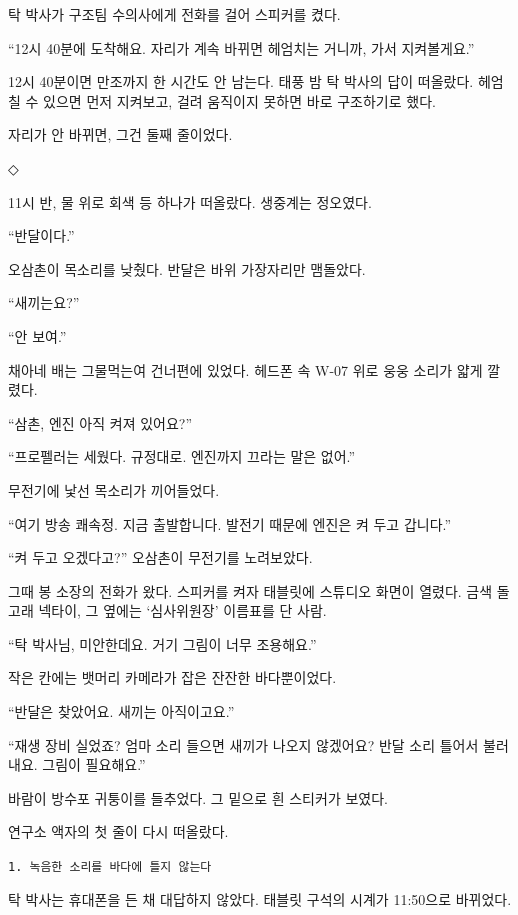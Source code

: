 \documentclass[
  korean,
  letterpaper,
  twoside,
  open=any,
  fontsize=12.5pt,
  headings=small]{scrbook}
\newcommand{\dateline}[1]{\par\noindent{\sffamily\small\color{gray}#1}\par\medskip}
\begin{document}
탁 박사가 구조팀 수의사에게
전화를 걸어 스피커를 켰다.

``12시 40분에 도착해요. 자리가
계속 바뀌면 헤엄치는 거니까,
가서 지켜볼게요.''

12시 40분이면 만조까지 한
시간도 안 남는다. 태풍 밤 탁
박사의 답이 떠올랐다. 헤엄칠
수 있으면 먼저 지켜보고, 걸려
움직이지 못하면 바로
구조하기로 했다.

자리가 안 바뀌면, 그건 둘째
줄이었다.

\begin{center}◇\end{center}\nopagebreak

11시 반, 물 위로 회색 등
하나가 떠올랐다. 생중계는
정오였다.

``반달이다.''

오삼촌이 목소리를 낮췄다.
반달은 바위 가장자리만
맴돌았다.

``새끼는요?''

``안 보여.''

채아네 배는 그물먹는여
건너편에 있었다. 헤드폰 속
W-07 위로 웅웅 소리가 얇게
깔렸다.

``삼촌, 엔진 아직 켜져
있어요?''

``프로펠러는 세웠다. 규정대로.
엔진까지 끄라는 말은 없어.''

무전기에 낯선 목소리가
끼어들었다.

``여기 방송 쾌속정. 지금
출발합니다. 발전기 때문에
엔진은 켜 두고 갑니다.''

``켜 두고 오겠다고?'' 오삼촌이
무전기를 노려보았다.

그때 봉 소장의 전화가 왔다.
스피커를 켜자 태블릿에
스튜디오 화면이 열렸다. 금색
돌고래 넥타이, 그 옆에는
`심사위원장' 이름표를 단 사람.

``탁 박사님, 미안한데요. 거기
그림이 너무 조용해요.''

작은 칸에는 뱃머리 카메라가
잡은 잔잔한 바다뿐이었다.

``반달은 찾았어요. 새끼는
아직이고요.''

``재생 장비 실었죠? 엄마 소리
들으면 새끼가 나오지 않겠어요?
반달 소리 틀어서 불러내요.
그림이 필요해요.''

바람이 방수포 귀퉁이를
들추었다. 그 밑으로 흰
스티커가 보였다.

\dateline{재생 장비}

연구소 액자의 첫 줄이 다시
떠올랐다.

\mbox{\texttt{1. 녹음한 소리를 바다에 틀지 않는다}}

탁 박사는 휴대폰을 든 채
대답하지 않았다. 태블릿 구석의
시계가 11:50으로 바뀌었다.
\end{document}
